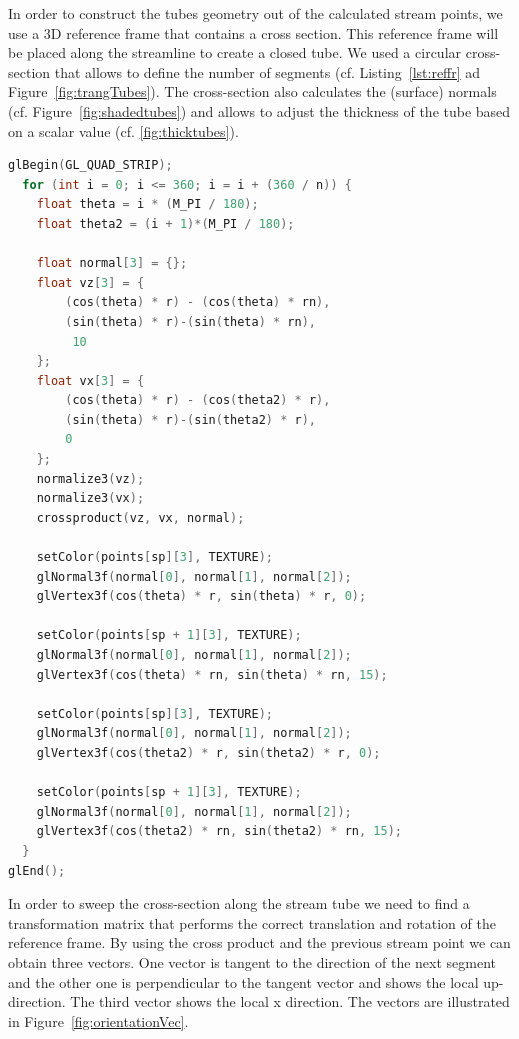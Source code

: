 In order to construct the tubes geometry out of the calculated stream points, we use a 3D reference frame that contains a cross section. This reference frame will be placed along the streamline to create a closed tube. We used a circular cross-section that allows to define the number of segments (cf. Listing~\ref{lst:reffr} ad Figure~\ref{fig:trangTubes}). The cross-section also calculates the  (surface) normals (cf. Figure~\ref{fig:shadedtubes}) and allows to adjust the thickness of the tube based on a scalar value (cf. \ref{fig:thicktubes}). 
  
\begin{lstlisting}[language=C,caption={Cross-section in 3D reference frame},label=lst:reffr]
glBegin(GL_QUAD_STRIP);
  for (int i = 0; i <= 360; i = i + (360 / n)) {
    float theta = i * (M_PI / 180);
    float theta2 = (i + 1)*(M_PI / 180);
    
    float normal[3] = {};
    float vz[3] = {
        (cos(theta) * r) - (cos(theta) * rn),
        (sin(theta) * r)-(sin(theta) * rn),
         10 
    };
    float vx[3] = {
        (cos(theta) * r) - (cos(theta2) * r),
        (sin(theta) * r)-(sin(theta2) * r),
        0
    };
    normalize3(vz);
    normalize3(vx);
    crossproduct(vz, vx, normal);

    setColor(points[sp][3], TEXTURE);
    glNormal3f(normal[0], normal[1], normal[2]);
    glVertex3f(cos(theta) * r, sin(theta) * r, 0);

    setColor(points[sp + 1][3], TEXTURE);
    glNormal3f(normal[0], normal[1], normal[2]);
    glVertex3f(cos(theta) * rn, sin(theta) * rn, 15);

    setColor(points[sp][3], TEXTURE);
    glNormal3f(normal[0], normal[1], normal[2]);
    glVertex3f(cos(theta2) * r, sin(theta2) * r, 0);

    setColor(points[sp + 1][3], TEXTURE);
    glNormal3f(normal[0], normal[1], normal[2]);
    glVertex3f(cos(theta2) * rn, sin(theta2) * rn, 15);
  }
glEnd();
\end{lstlisting}  
  
 In order to sweep the cross-section along the stream tube we need to find a transformation matrix that performs the correct translation and rotation of the reference frame. By using the cross product and the previous stream point we can obtain three vectors. One vector is tangent to the direction of the next segment and the other one is perpendicular to the tangent vector and shows the local up-direction. The third vector shows the local x direction.  The vectors are illustrated in Figure~\ref{fig:orientationVec}.
 
